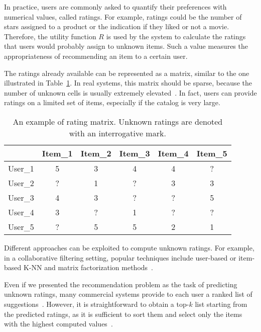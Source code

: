 In practice, users are commonly asked to quantify their preferences with numerical values, called ratings. For example, ratings could be the number of stars assigned to a product or the indication if they liked or not a movie. Therefore, the utility function $R$ is used by the system to calculate the ratings that users would probably assign to unknown items. Such a value measures the appropriateness of recommending an item to a certain user.

The ratings already available can be represented as a matrix, similar to the one illustrated in Table~\ref{soa:tab:ratings}. In real systems, this matrix should be sparse, because the number of unknown cells is usually extremely elevated~\cite{Ricci2015}. In fact, users can provide ratings on a limited set of items, especially if the catalog is very large.

\begin{table}
\centering
\begin{tabular}{@{}lccccc@{}}
\toprule
        & Item\_1 & Item\_2 & Item\_3 & Item\_4 & Item\_5 \\ \midrule
User\_1 & 5       & 3       & 4       & 4       & ?       \\
User\_2 & ?       & 1       & ?       & 3       & 3       \\
User\_3 & 4       & 3       & ?       & ?       & 5       \\
User\_4 & 3       & ?       & 1       & ?       & ?       \\
User\_5 & ?       & 5       & 5       & 2       & 1       \\ \bottomrule
\end{tabular}
\caption[Example of rating matrix]{An example of rating matrix. Unknown ratings are denoted with an interrogative mark.}
\label{soa:tab:ratings}
\end{table}

Different approaches can be exploited to compute unknown ratings. For example, in a collaborative filtering setting, popular techniques include user-based or item-based K-NN and matrix factorization methods~\cite{Jannach2010}.

Even if we presented the recommendation problem as the task of predicting unknown ratings, many commercial systems provide to each user a ranked list of suggestions~\cite{Lu2015}. However, it is straightforward to obtain a top-$k$ list starting from the predicted ratings, as it is sufficient to sort them and select only the items with the highest computed values~\cite{Adomavicius2015}.

